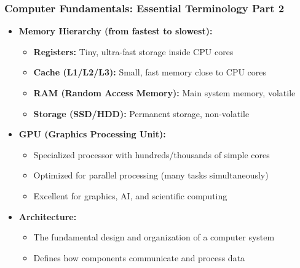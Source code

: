 \begin{frame}
\frametitle{Computer Fundamentals: Essential Terminology Part 2}
\begin{itemize}
    \item \textbf{Memory Hierarchy (from fastest to slowest):}
    \begin{itemize}
        \item \textbf{Registers:} Tiny, ultra-fast storage inside CPU cores
        \item \textbf{Cache (L1/L2/L3):} Small, fast memory close to CPU cores
        \item \textbf{RAM (Random Access Memory):} Main system memory, volatile
        \item \textbf{Storage (SSD/HDD):} Permanent storage, non-volatile
    \end{itemize}
    \item \textbf{GPU (Graphics Processing Unit):}
    \begin{itemize}
        \item Specialized processor with hundreds/thousands of simple cores
        \item Optimized for parallel processing (many tasks simultaneously)
        \item Excellent for graphics, AI, and scientific computing
    \end{itemize}
    \item \textbf{Architecture:}
    \begin{itemize}
        \item The fundamental design and organization of a computer system
        \item Defines how components communicate and process data
    \end{itemize}
\end{itemize}
\end{frame}

